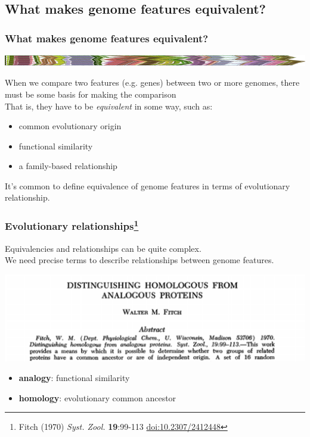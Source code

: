 
\subsection{What makes genome features equivalent?}

\begin{frame}
  \frametitle{What makes genome features equivalent?}
  \begin{center}
    \includegraphics[width=1\textwidth]{images/collinear_zeae}  
  \end{center}
  When we compare two features (e.g. genes) between two or more genomes, there must be some basis for making the comparison \\
  That is, they have to be \textit{equivalent} in some way, such as:
  \begin{itemize}
    \item common evolutionary origin
    \item functional similarity
    \item a family-based relationship
  \end{itemize}
  It's common to define equivalence of genome features in terms of evolutionary relationship.
\end{frame}

\begin{frame}
  \frametitle{Evolutionary relationships\footnote{\tiny{Fitch (1970) \textit{Syst. Zool.} \textbf{19}:99-113 \href{http://dx.doi.org/10.2307/2412448}{doi:10.2307/2412448}}}}
  Equivalencies and relationships can be quite complex. \\
  We need precise terms to describe relationships between genome features. \\
  \begin{center}
    \includegraphics[width=1\textwidth]{images/fitch}  
  \end{center}  
  \begin{itemize}
    \item \textbf{analogy}: functional similarity
    \item \textbf{homology}: evolutionary common ancestor
  \end{itemize}    
\end{frame}

